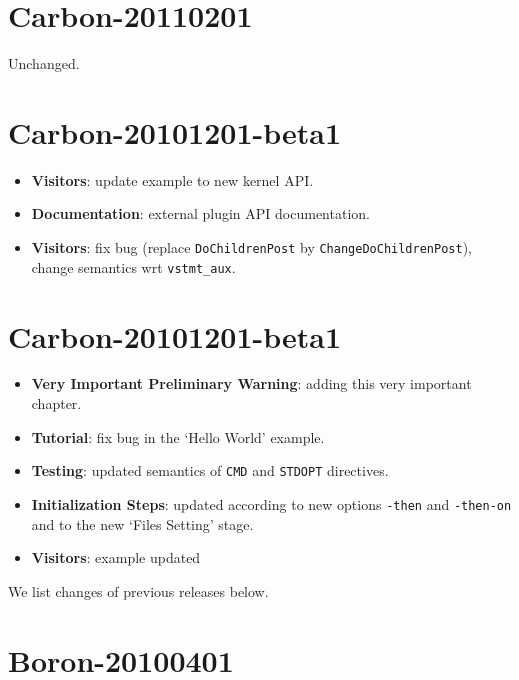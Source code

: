 \section*{Carbon-20110201}

Unchanged.

\section*{Carbon-20101201-beta1}

\begin{itemize}
\item \textbf{Visitors}: update example to new kernel API.
\item \textbf{Documentation}: external plugin API documentation.
\item \textbf{Visitors}: fix bug (replace \texttt{DoChildrenPost} by
  \texttt{ChangeDoChildrenPost}), change semantics wrt \verb+vstmt_aux+.
\end{itemize}

\section*{Carbon-20101201-beta1}

\begin{itemize}
\item \textbf{Very Important Preliminary Warning}: adding this very important
  chapter.
\item \textbf{Tutorial}: fix bug in the `Hello World' example.
\item \textbf{Testing}: updated semantics of \texttt{CMD} and
  \texttt{STDOPT} directives.
\item \textbf{Initialization Steps}: updated according to new options
  \texttt{-then} and \texttt{-then-on} and to the new `Files Setting' stage.
\item \textbf{Visitors}: example updated
\end{itemize}

We list changes of previous releases below.

\section*{Boron-20100401}

